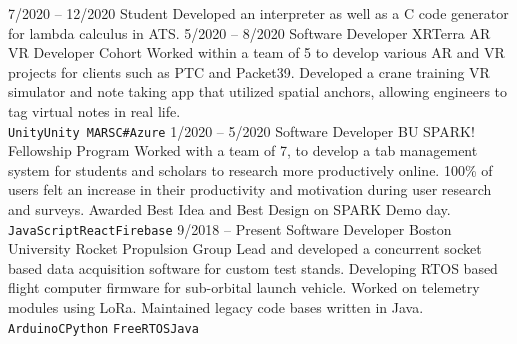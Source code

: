 \documentclass[9pt]{developercv} %
\begin{document}
\begin{entrylist}
  \entry
  {7/2020 -- 12/2020}
  {Student}
  {}
  {Developed an interpreter as well as a C code generator for lambda calculus in ATS.}
  \entry
  {5/2020 -- 8/2020}
  {Software Developer}
  {XRTerra AR VR Developer Cohort}
  {Worked within a team of 5 to develop various AR and VR projects for clients such as PTC
    and Packet39. Developed a crane training VR simulator and note taking app that utilized
    spatial anchors, allowing engineers to tag virtual notes in real life.\\
    \texttt{Unity}\slashsep\texttt{Unity MARS}\slashsep\texttt{C\#}\slashsep\texttt{Azure}}
  \entry
  {1/2020 -- 5/2020}
  {Software Developer}
  {BU SPARK! Fellowship Program}
  {Worked with a team of 7, to develop a tab management system for students and
    scholars to research more productively online. 100\% of users felt an increase in
    their productivity and motivation during user research and surveys. Awarded Best
    Idea and Best Design on SPARK Demo day.\\
    \texttt{JavaScript}\slashsep\texttt{React}\slashsep\texttt{Firebase}}
  \entry
  {9/2018 -- Present}
  {Software Developer}
  {Boston University Rocket Propulsion Group}
  {Lead and developed a concurrent socket based data acquisition software for custom test stands.
    Developing RTOS based flight computer firmware for sub-orbital launch vehicle. Worked
    on telemetry modules using LoRa. Maintained legacy code bases written in Java.\\\texttt{Arduino}\slashsep\texttt{C}\slashsep\texttt{Python}
    \slashsep\texttt{FreeRTOS}\slashsep\texttt{Java}}

\end{entrylist}
\end{document}
